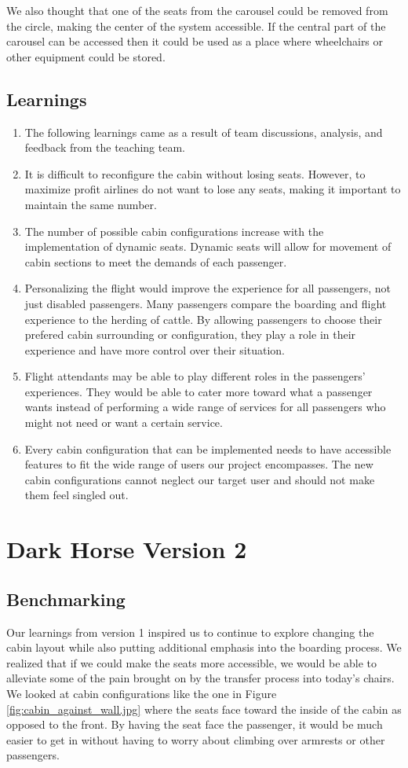 We also thought that one of the seats from the carousel could be removed from the circle, making the center of the system accessible. If the central part of the carousel can be accessed then it could be used as a place where wheelchairs or other equipment could be stored.


\subsection{Learnings}
\begin{enumerate}
	\item The following learnings came as a result of team discussions, analysis, and feedback from the teaching team. 
	\item It is difficult to reconfigure the cabin without losing seats. However, to maximize profit airlines do not want to lose any seats, making it important to maintain the same number.
	\item The number of possible cabin configurations increase with the implementation of dynamic seats.  Dynamic seats will allow for movement of cabin sections to meet the demands of each passenger. 
	\item Personalizing the flight would improve the experience for all passengers, not just disabled passengers. Many passengers compare the boarding and flight experience to the herding of cattle. By allowing passengers to choose their prefered cabin surrounding or configuration, they play a role in their experience and have more control over their situation. 
	\item Flight attendants may be able to play different roles in the passengers’ experiences.  They would be able to cater more toward what a passenger wants instead of performing a wide range of services for all passengers who might not need or want a certain service. 
	\item Every cabin configuration that can be implemented needs to have accessible features to fit the wide range of users our project encompasses.  The new cabin configurations cannot neglect our target user and should not make them feel singled out. 
\end{enumerate}

\section{Dark Horse Version 2}
\subsection{Benchmarking}
Our learnings from version 1 inspired us to continue to explore changing the cabin layout while also putting additional emphasis into the boarding process. We realized that if we could make the seats more accessible, we would be able to alleviate some of the pain brought on by the transfer process into today’s chairs. We looked at cabin configurations like the one in Figure \ref{fig:cabin_against_wall.jpg} where the seats face toward the inside of the cabin as opposed to the front. By having the seat face the passenger, it would be much easier to get in without having to worry about climbing over armrests or other passengers. 

